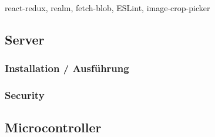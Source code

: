 react-redux, realm, fetch-blob, ESLint, image-crop-picker
\subsection{Server}
    
    \subsubsection{Installation / Ausführung}
    \subsubsection{Security}

\subsection{Microcontroller}
    
    